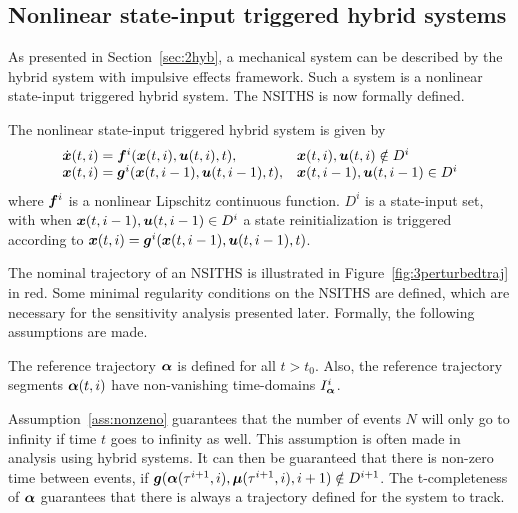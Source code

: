 \documentclass[../DC2017114Bouma.tex]{subfiles}
\begin{document}
\subsection{Nonlinear state-input triggered hybrid systems}
As presented in Section~\ref{sec:2hyb}, a mechanical system can be described by the hybrid system with impulsive effects framework. Such a system is a nonlinear state-input triggered hybrid system. The NSITHS is now formally defined.

\begin{mydef}[NSITHS]\label{def:3nsiths}
The nonlinear state-input triggered hybrid system is given by
\begin{equation}
\begin{array}{ll}
\dot{{\boldsymbol{x}}}(t,i) ={\boldsymbol{f}}^i({\boldsymbol{x}}(t,i),{\boldsymbol{u}}(t,i),t),& {\boldsymbol{x}}(t,i),{\boldsymbol{u}}(t,i)\notin D^i\\
{\boldsymbol{x}}(t,i) = {\boldsymbol{g}}^i({\boldsymbol{x}}(t,i-1),{\boldsymbol{u}}(t,i-1),t),& {\boldsymbol{x}}(t,i-1),{\boldsymbol{u}}(t,i-1)\in D^i
\end{array}\label{eq:3hybimp}
\end{equation}
where ${\boldsymbol{f}}^i$ is a nonlinear Lipschitz continuous function. $D^i$ is a state-input set, with when ${\boldsymbol{x}}(t,i-1),{\boldsymbol{u}}(t,i-1)\in D^i$ a state reinitialization is triggered according to ${\boldsymbol{x}}(t,i) = {\boldsymbol{g}}^i({\boldsymbol{x}}(t,i-1),{\boldsymbol{u}}(t,i-1),t)$.
\end{mydef} 

The nominal trajectory of an NSITHS is illustrated in Figure~\ref{fig:3perturbedtraj} in red. Some minimal regularity conditions on the NSITHS are defined, which are necessary for the sensitivity analysis presented later. Formally, the following assumptions are made.

\begin{myass}
The reference trajectory $\boldsymbol{\alpha}$ is defined for all $t>t_0$. Also, the reference trajectory segments $\boldsymbol{\alpha}(t,i)$ have non-vanishing time-domains $I_{\boldsymbol{\alpha}}^i$.\label{ass:nonzeno}
\end{myass}

Assumption~\ref{ass:nonzeno} guarantees that the number of events $N$ will only go to infinity if time $t$ goes to infinity as well. This assumption is often made in analysis using hybrid systems. It can then be guaranteed that there is non-zero time between events, if ${\boldsymbol{g}}(\boldsymbol{\alpha}(\tau^{i+1},i),\boldsymbol{\mu}(\tau^{i+1},i),i+1)\notin D^{i+1}$. The t-completeness of $\boldsymbol{\alpha}$ guarantees that there is always a trajectory defined for the system to track.
\end{document}
